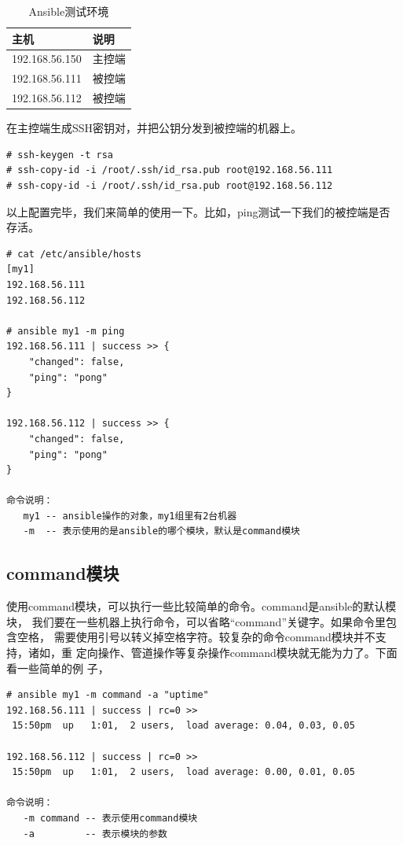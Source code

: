 \begin{table}[!ht]
  \centering
    \begin{tabular}{ll}
      \toprule
      主机           & 说明   \\
      \midrule
      192.168.56.150 & 主控端 \\
      192.168.56.111 & 被控端 \\
      192.168.56.112 & 被控端 \\
      \bottomrule
    \end{tabular}
    \caption{Ansible测试环境}
    \label{tab:AnsibleTestEnv}
\end{table}

在主控端生成SSH密钥对，并把公钥分发到被控端的机器上。
\begin{verbatim}
# ssh-keygen -t rsa
# ssh-copy-id -i /root/.ssh/id_rsa.pub root@192.168.56.111
# ssh-copy-id -i /root/.ssh/id_rsa.pub root@192.168.56.112
\end{verbatim}
以上配置完毕，我们来简单的使用一下。比如，ping测试一下我们的被控端是否
存活。
\begin{verbatim}
# cat /etc/ansible/hosts
[my1]
192.168.56.111
192.168.56.112

# ansible my1 -m ping 
192.168.56.111 | success >> {
    "changed": false, 
    "ping": "pong"
}

192.168.56.112 | success >> {
    "changed": false, 
    "ping": "pong"
}

命令说明：
   my1 -- ansible操作的对象，my1组里有2台机器
   -m  -- 表示使用的是ansible的哪个模块，默认是command模块
\end{verbatim}
\subsection{command模块}
\label{sec:AnsibleCommandMod}

使用command模块，可以执行一些比较简单的命令。command是ansible的默认模块，
我们要在一些机器上执行命令，可以省略“command”关键字。如果命令里包含空格，
需要使用引号以转义掉空格字符。较复杂的命令command模块并不支持，诸如，重
定向操作、管道操作等复杂操作command模块就无能为力了。下面看一些简单的例
子，
\begin{verbatim}
# ansible my1 -m command -a "uptime"
192.168.56.111 | success | rc=0 >>
 15:50pm  up   1:01,  2 users,  load average: 0.04, 0.03, 0.05

192.168.56.112 | success | rc=0 >>
 15:50pm  up   1:01,  2 users,  load average: 0.00, 0.01, 0.05

命令说明：
   -m command -- 表示使用command模块
   -a         -- 表示模块的参数
\end{verbatim}

